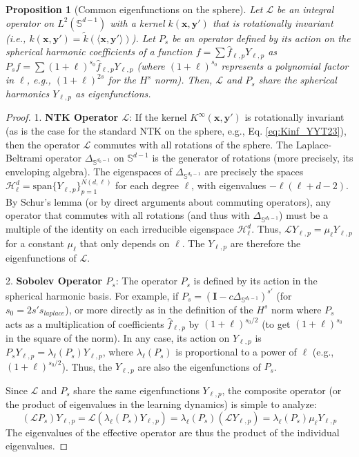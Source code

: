\documentclass{article}
\newtheorem{proposition}[theorem]{Proposition}
\begin{document}
\begin{proposition}[Common eigenfunctions on the sphere]
Let $\mathcal{L}$ be an integral operator on $L^2(\mathbb{S}^{d-1})$ with a kernel $k(\mathbf{x}, \mathbf{y}')$ that is rotationally invariant (i.e., $k(\mathbf{x}, \mathbf{y}') = \tilde{k}(\langle \mathbf{x}, \mathbf{y}' \rangle)$). Let $P_s$ be an operator defined by its action on the spherical harmonic coefficients of a function $f = \sum \hat{f}_{\ell,p} Y_{\ell,p}$ as $P_s f = \sum (1+\ell)^{s_0} \hat{f}_{\ell,p} Y_{\ell,p}$ (where $(1+\ell)^{s_0}$ represents a polynomial factor in $\ell$, e.g., $(1+\ell)^{2s}$ for the $H^s$ norm). Then, $\mathcal{L}$ and $P_s$ share the spherical harmonics $Y_{\ell,p}$ as eigenfunctions.
\end{proposition}
\begin{proof}
1. \textbf{NTK Operator $\mathcal{L}$}: If the kernel $K^{\infty}(\mathbf{x}, \mathbf{y}')$ is rotationally invariant (as is the case for the standard NTK on the sphere, e.g., Eq. \eqref{eq:Kinf_YYT23}), then the operator $\mathcal{L}$ commutes with all rotations of the sphere. The Laplace-Beltrami operator $\Delta_{\mathbb{S}^{d_0-1}}$ on $\mathbb{S}^{d-1}$ is the generator of rotations (more precisely, its enveloping algebra). The eigenspaces of $\Delta_{\mathbb{S}^{d_0-1}}$ are precisely the spaces $\mathcal{H}^d_\ell = \text{span}\{Y_{\ell,p}\}_{p=1}^{N(d,\ell)}$ for each degree $\ell$, with eigenvalues $- \ell(\ell+d-2)$.
    By Schur's lemma (or by direct arguments about commuting operators), any operator that commutes with all rotations (and thus with $\Delta_{\mathbb{S}^{d_0-1}}$) must be a multiple of the identity on each irreducible eigenspace $\mathcal{H}^d_\ell$. Thus, $\mathcal{L} Y_{\ell,p} = \mu_\ell Y_{\ell,p}$ for a constant $\mu_\ell$ that only depends on $\ell$. The $Y_{\ell,p}$ are therefore the eigenfunctions of $\mathcal{L}$.

2. \textbf{Sobolev Operator $P_s$}: The operator $P_s$ is defined by its action in the spherical harmonic basis. For example, if $P_s = (\mathbf{I} - c \Delta_{\mathbb{S}^{d_0-1}})^{s'}$ (for $s_0 = 2s's_{laplace}$), or more directly as in the definition of the $H^s$ norm where $P_s$ acts as a multiplication of coefficients $\hat{f}_{\ell,p}$ by $(1+\ell)^{s_0/2}$ (to get $(1+\ell)^{s_0}$ in the square of the norm). In any case, its action on $Y_{\ell,p}$ is $P_s Y_{\ell,p} = \lambda_\ell(P_s) Y_{\ell,p}$, where $\lambda_\ell(P_s)$ is proportional to a power of $\ell$ (e.g., $(1+\ell)^{s_0/2}$). Thus, the $Y_{\ell,p}$ are also the eigenfunctions of $P_s$.

Since $\mathcal{L}$ and $P_s$ share the same eigenfunctions $Y_{\ell,p}$, the composite operator (or the product of eigenvalues in the learning dynamics) is simple to analyze:
\begin{equation*}
    (\mathcal{L} P_s) Y_{\ell,p} = \mathcal{L} (\lambda_\ell(P_s) Y_{\ell,p}) = \lambda_\ell(P_s) (\mathcal{L} Y_{\ell,p}) = \lambda_\ell(P_s) \mu_\ell Y_{\ell,p}
\end{equation*}
The eigenvalues of the effective operator are thus the product of the individual eigenvalues.
\end{proof}
\end{document}
